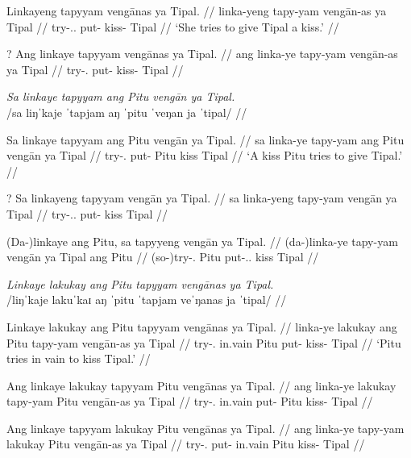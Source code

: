 \documentclass[12pt,a4paper]{scrartcl}
\newcommand{\TsgF}{{\Tsg}.{\F}}
\begin{document}
\gla Linkayeng tapyyam vengānas ya Tipal. //
\glb linka-yeng tapy-yam vengān-as ya Tipal //
\glc try-\TsgF{}.\Aarg{} put-\Ptcp{} kiss-\Parg{} \Loc{} Tipal //
\glft `She tries to give Tipal a kiss.' //
\endgl

\a\ljudge?\begingl
\gla Ang linkaye tapyyam vengānas ya Tipal. //
\glb ang linka-ye tapy-yam vengān-as ya Tipal //
\glc \AgtT{} try-\TsgF{} put-\Ptcp{} kiss-\Parg{} \Loc{} Tipal //
\endgl
\xe

\pex
\a\begingl
\glpreamble \textit{Sa linkaye tapyyam ang Pitu vengān ya Tipal.} \\
	/sa liŋˈkaje ˈtapjam aŋ ˈpitu ˈveŋan ja ˈtipal/ //

\gla Sa linkaye tapyyam ang Pitu vengān ya Tipal. //
\glb sa linka-ye tapy-yam ang Pitu vengān ya Tipal //
\glc \PatT{} try-\TsgF{} put-\Ptcp{} \Aarg{} Pitu kiss \Loc{} Tipal //
\glft `A kiss Pitu tries to give Tipal.' //
\endgl

\a\label{ex:pattopofembeddedditrans}\ljudge?\begingl
\gla Sa linkayeng tapyyam vengān ya Tipal. //
\glb sa linka-yeng tapy-yam vengān ya Tipal //
\glc \PatT{} try-\TsgF{}.\Aarg{} put-\Ptcp{} kiss \Loc{} Tipal //
\endgl

\a\begingl
\gla (Da-)linkaye ang Pitu, sa tapyyeng vengān ya Tipal. //
\glb (da-)linka-ye tapy-yam vengān ya Tipal ang Pitu //
\glc (so-)try-\TsgF{} \Aarg{} Pitu \PatT{} put-\TsgF{}.\Aarg{} kiss \Loc{} Tipal //
\endgl
\xe

\pex
\a\begingl
\glpreamble \textit{Linkaye lakukay ang Pitu tapyyam vengānas ya Tipal.}\footnotemark \\
	/liŋˈkaje lakuˈkaɪ aŋ ˈpitu ˈtapjam veˈŋanas ja ˈtipal/ //

\gla Linkaye lakukay ang Pitu tapyyam vengānas ya Tipal. //
\glb linka-ye lakukay ang Pitu tapy-yam vengān-as ya Tipal //
\glc try-\TsgF{} in.vain \Aarg{} Pitu put-\Ptcp{} kiss-\Parg{} \Loc{} Tipal //
\glft `Pitu tries in vain to kiss Tipal.' //
\endgl

\a\begingl
\gla Ang linkaye lakukay tapyyam Pitu vengānas ya Tipal. //
\glb ang linka-ye lakukay tapy-yam Pitu vengān-as ya Tipal //
\glc \AgtT{} try-\TsgF{} in.vain put-\Ptcp{} Pitu kiss-\Parg{} \Loc{} Tipal //
\endgl

\a\begingl
\gla Ang linkaye tapyyam lakukay Pitu vengānas ya Tipal. //
\glb ang linka-ye tapy-yam lakukay Pitu vengān-as ya Tipal //
\glc \AgtT{} try-\TsgF{} put-\Ptcp{} in.vain Pitu kiss-\Parg{} \Loc{} Tipal //
\endgl
\xe

\end{document}
